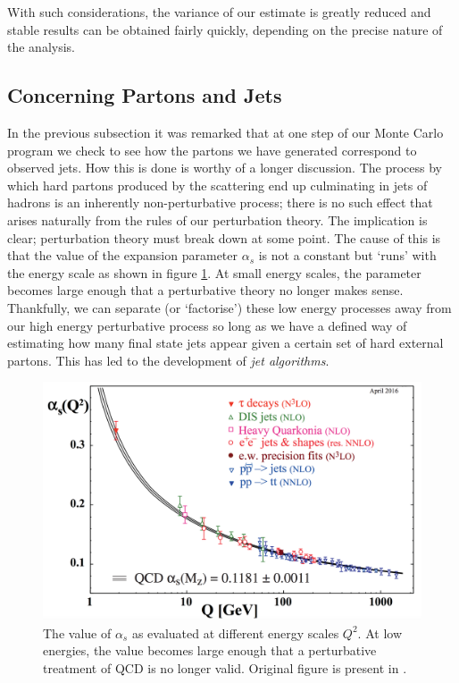 With such considerations, the variance of our estimate is greatly reduced and stable results can be obtained fairly quickly, depending on the precise nature of the analysis. 

\subsection{Concerning Partons and Jets}
In the previous subsection it was remarked that at one step of our Monte Carlo program we check to see how the partons we have generated correspond to observed jets. How this is done is worthy of a longer discussion. The process by which hard partons produced by the scattering end up culminating in jets of hadrons is an inherently non-perturbative process; there is no such effect that arises naturally from the rules of our perturbation theory. The implication is clear; perturbation theory must break down at some point. The cause of this is that the value of the expansion parameter $\alpha_s$ is not a constant but `runs' with the energy scale as shown in figure \ref{fig:alphas}. At small energy scales, the parameter becomes large enough that a perturbative theory no longer makes sense. Thankfully, we can separate (or `factorise') these low energy processes away from our high energy perturbative process so long as we have a defined way of estimating how many final state jets appear given a certain set of hard external partons. This has led to the development of \emph{jet algorithms}. 

\begin{figure}[t]
\centering
\includegraphics[scale=0.3]{Images/running_alphas.png} 
\caption{The value of $\alpha_s$ as evaluated at different energy scales $Q^2$. At low energies, the value becomes large enough that a perturbative treatment of QCD is no longer valid. Original figure is present in \cite{Hagiwara2002}.}
\label{fig:alphas}
\end{figure}

